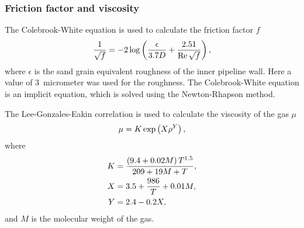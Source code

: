 \subsubsection{Friction factor and viscosity}
The Colebrook-White equation \cite{Colebrook1939Turbulent} is used to calculate the friction factor $f$
\begin{align}
    \frac{1}{\sqrt{f}} = -2\log \del{\frac{\epsilon}{3.7 D} + \frac{2.51}{\Reyn \sqrt{f}}}
    \label{eq:colebrookWhite}
,
\end{align}
where $\epsilon$ is the sand grain equivalent roughness of the inner pipeline wall. Here a value of 3~micrometer was used for the roughness. The Colebrook-White equation is an implicit equation, which is solved using the Newton-Rhapson method. 

The Lee-Gonzales-Eakin correlation \cite{Lee1966Viscosity} is used to calculate the viscosity of the gas $\mu$
\begin{align}
    \mu = K\exp\del{X\rho^Y},
\label{eq:LGE}
\end{align}
where
\begin{align}
    K &= \frac{\del{9.4+0.02M} T^{1.5}}{209 + 19 M + T}, \\
    X &= 3.5 + \frac{986}{T} + 0.01 M, \\
    Y &= 2.4 - 0.2X
,
\end{align}
and $M$ is the molecular weight of the gas.